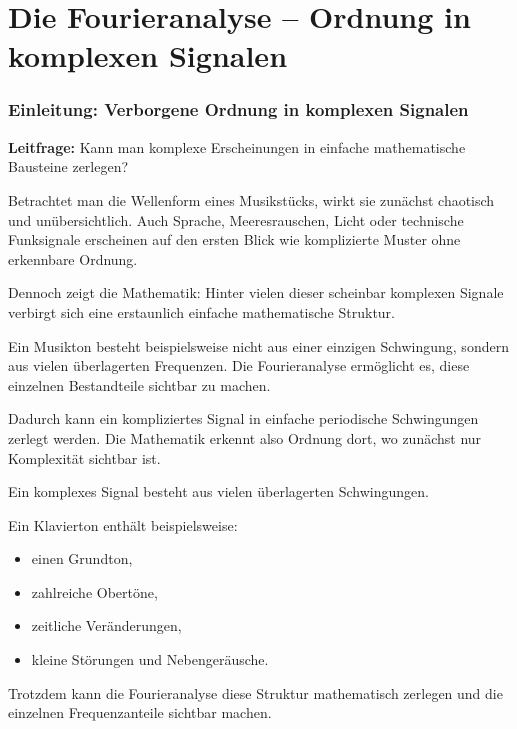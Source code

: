 \chapter{Die Fourieranalyse -- Ordnung in komplexen Signalen}
\label{chap:fourieranalyse}

\subsection{Einleitung: Verborgene Ordnung in komplexen Signalen}

\textbf{Leitfrage:}
Kann man komplexe Erscheinungen in einfache mathematische Bausteine zerlegen?

\medskip

Betrachtet man die Wellenform eines Musikstücks,
wirkt sie zunächst chaotisch und unübersichtlich.
Auch Sprache,
Meeresrauschen,
Licht oder technische Funksignale erscheinen auf den ersten Blick
wie komplizierte Muster ohne erkennbare Ordnung.

Dennoch zeigt die Mathematik:
Hinter vielen dieser scheinbar komplexen Signale
verbirgt sich eine erstaunlich einfache mathematische Struktur.

Ein Musikton besteht beispielsweise nicht aus einer einzigen Schwingung,
sondern aus vielen überlagerten Frequenzen.
Die Fourieranalyse ermöglicht es,
diese einzelnen Bestandteile sichtbar zu machen.

Dadurch kann ein kompliziertes Signal
in einfache periodische Schwingungen zerlegt werden.
Die Mathematik erkennt also Ordnung dort,
wo zunächst nur Komplexität sichtbar ist.

\begin{DidacticBox}
	\small
	\label{box:fourier-komplexes-signal}
	Ein komplexes Signal besteht aus vielen überlagerten Schwingungen.
	
	Ein Klavierton enthält beispielsweise:
	
	\begin{itemize}
		\item einen Grundton,
		\item zahlreiche Obertöne,
		\item zeitliche Veränderungen,
		\item kleine Störungen und Nebengeräusche.
	\end{itemize}
	
	Trotzdem kann die Fourieranalyse diese Struktur mathematisch zerlegen
	und die einzelnen Frequenzanteile sichtbar machen.
\end{DidacticBox}

